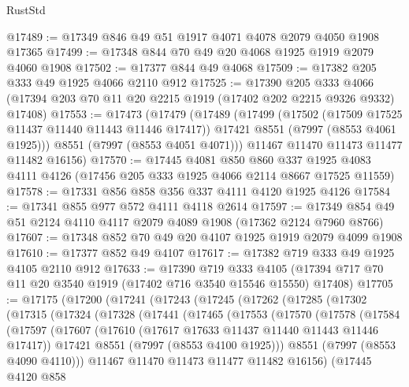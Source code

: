 \begin{lexlean}{RustStd}
\begin{coremodule}
@17489 := @17349 @846 @49 @51 @1917 @4071 @4078 @2079 @4050 @1908 @17365
@17499 := @17348 @844 @70 @49 @20 @4068 @1925 @1919 @2079 @4060 @1908
@17502 := @17377 @844 @49 @4068
@17509 := @17382 @205 @333 @49 @1925 @4066 @2110 @912
@17525 := @17390
    @205
    @333
    @4066
    (@17394 @203 @70 @11 @20 @2215 @1919 (@17402 @202 @2215 @9326 @9332) @17408)
@17553 := @17473
    (@17479
      (@17489
        (@17499
          (@17502 (@17509 @17525 @11437 @11440 @11443 @11446 @17417))
          @17421
          @8551
          (@7997 (@8553 @4061 @1925)))
        @8551
        (@7997 (@8553 @4051 @4071)))
      @11467
      @11470
      @11473
      @11477
      @11482
      @16156)
@17570 := @17445
    @4081
    @850
    @860
    @337
    @1925
    @4083
    @4111
    @4126
    (@17456 @205 @333 @1925 @4066 @2114 @8667 @17525 @11559)
@17578 := @17331 @856 @858 @356 @337 @4111 @4120 @1925 @4126
@17584 := @17341 @855 @977 @572 @4111 @4118 @2614
@17597 := @17349 @854 @49 @51 @2124 @4110 @4117 @2079 @4089 @1908 (@17362 @2124 @7960 @8766)
@17607 := @17348 @852 @70 @49 @20 @4107 @1925 @1919 @2079 @4099 @1908
@17610 := @17377 @852 @49 @4107
@17617 := @17382 @719 @333 @49 @1925 @4105 @2110 @912
@17633 := @17390
    @719
    @333
    @4105
    (@17394 @717 @70 @11 @20 @3540 @1919 (@17402 @716 @3540 @15546 @15550) @17408)
@17705 := @17175
    (@17200
      (@17241
        (@17243
          (@17245
            (@17262
              (@17285
                (@17302
                  (@17315
                    (@17324
                      (@17328
                        (@17441
                          (@17465
                            (@17553
                              (@17570
                                (@17578
                                  (@17584
                                    (@17597
                                      (@17607
                                        (@17610 (@17617 @17633 @11437 @11440 @11443 @11446 @17417))
                                        @17421
                                        @8551
                                        (@7997 (@8553 @4100 @1925)))
                                      @8551
                                      (@7997 (@8553 @4090 @4110)))
                                    @11467
                                    @11470
                                    @11473
                                    @11477
                                    @11482
                                    @16156)
                                  (@17445
                                    @4120
                                    @858

\end{coremodule}
\end{lexlean}
